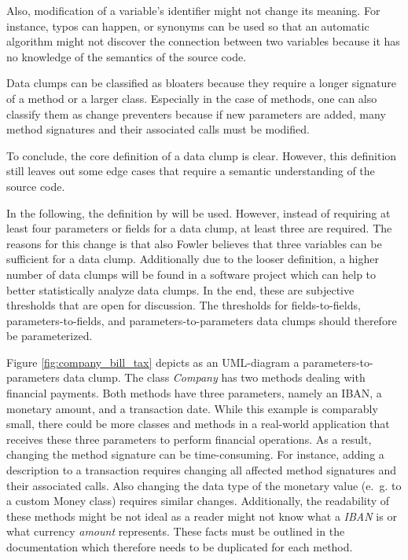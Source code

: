 Also, modification of a variable's identifier might not change its meaning. For instance, typos can happen, or synonyms can be used so that an automatic algorithm might not discover the connection between two variables because it has no knowledge of the semantics of the source code. \cite{zhangImprovingPrecisionFowler2008}


Data clumps can be classified as bloaters because they require a longer signature of a method or a larger class. Especially in the case of methods, one can also classify them as change preventers because if new parameters are added, many method signatures and their associated calls must be modified.

To conclude, the core definition of a data clump is clear. However, this definition still leaves out some edge cases that require a semantic understanding of the source code. 



In the following, the definition by \cite{zhangImprovingPrecisionFowler2008} will be used. However,  instead of requiring at least four parameters or fields for a data clump, at least three are required. The reasons for this change is that also Fowler believes that three variables can be sufficient for a data clump. Additionally due to the looser definition, a higher number of data clumps will be found in a software project which can help to better statistically analyze data clumps. In the end, these are subjective thresholds that are open for discussion. The thresholds for fields-to-fields, parameters-to-fields, and parameters-to-parameters data clumps should therefore be parameterized. 




Figure \ref{fig:company_bill_tax} depicts as an UML-diagram a parameters-to-parameters data clump. The class \textit{Company} has two methods dealing with financial payments. Both methods  have three parameters, namely an IBAN, a monetary amount, and a transaction date. While this example is comparably small, there could be more classes and methods in a real-world application that receives these three parameters to perform financial operations. As a result, changing the method signature can be time-consuming. For instance, adding a description to a transaction requires changing all affected method signatures and their associated calls. Also changing the data type of the monetary value (e.~g. to a custom Money class) requires similar changes. Additionally, the readability of these methods might be not ideal as a reader might not know what a \textit{IBAN} is or what currency \textit{amount} represents. These facts must be outlined in the documentation which therefore needs to be duplicated for each method. 
 
